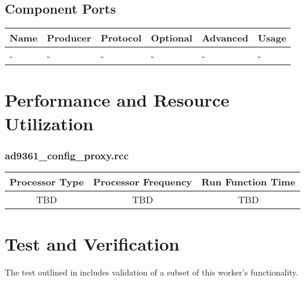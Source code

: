 \documentclass{article}
\def\comp{ad9361\_config\_proxy}
\begin{document}
\begin{landscape}
	\section*{Component Ports}
	\begin{scriptsize}
    \begin{longtable}{|p{}
                      |p{}
                      |p{}
                      |p{}
                      |p{}
                      |p{}|}
			\hline
			\rowcolor{blue}
			Name & Producer & Protocol           & Optional & Advanced & Usage                  \\
			\hline
			-  & -     & - & -     & -        & - \\
			\hline
		\end{longtable}
	\end{scriptsize}
\end{landscape}

\section*{Performance and Resource Utilization}
\subsubsection*{\comp.rcc}
\begin{scriptsize}
        \begin{tabular}{|c|c|c|}
                \hline
                \rowcolor{blue}
                Processor Type & Processor Frequency & Run Function Time \\
                \hline
                TBD            & TBD                 & TBD               \\
                \hline
        \end{tabular}
\end{scriptsize}

\section*{Test and Verification}
The test outlined in \cite{dac_comp_datasheet} includes validation of a subset of this worker's functionality.
\end{document}
